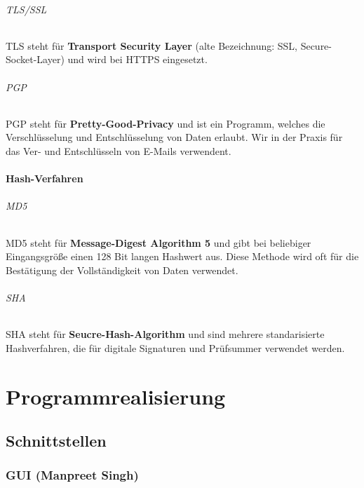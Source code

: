 \documentclass[12pt,a4paper]{report}
\begin{document}
\paragraph{TLS/SSL}

TLS steht für \textbf{Transport Security Layer} (alte Bezeichnung: SSL, Secure-Socket-Layer) und wird bei HTTPS eingesetzt.

\paragraph{PGP}

PGP steht für \textbf{Pretty-Good-Privacy} und ist ein Programm, welches die Verschlüsselung und Entschlüsselung von Daten erlaubt. Wir in der Praxis für das Ver- und Entschlüsseln von E-Mails verwendent.

\subsection{Hash-Verfahren}

\paragraph{MD5}

MD5 steht für \textbf{Message-Digest Algorithm 5} und gibt bei beliebiger Eingangsgröße einen 128 Bit langen Hashwert aus. Diese Methode wird oft für die Bestätigung der Vollständigkeit von Daten verwendet.

\paragraph{SHA}

SHA steht für \textbf{Seucre-Hash-Algorithm} und sind mehrere standarisierte Hashverfahren, die für digitale Signaturen und Prüfsummer verwendet werden.

\part{Programmrealisierung}

\chapter{Schnittstellen}

\section{GUI (Manpreet Singh)}
\end{document}
